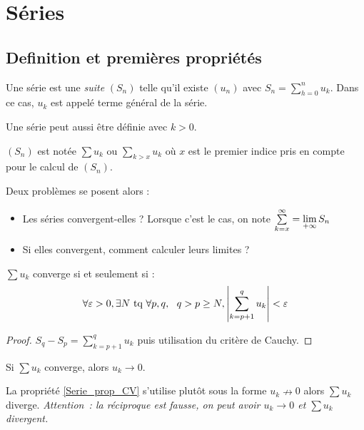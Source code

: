 \chapter{Séries}
\section{Definition et premières propriétés}

\begin{defi}
Une série est une \emph{suite} $(S_n)$ telle qu'il existe $(u_n)$ avec $S_n = \sum\limits_{h=0}^{n}u_k$. Dans ce cas, $u_k$ est appelé terme général de la série.
\end{defi}
\begin{rem}
	Une série peut aussi être définie avec $k>0$.
\end{rem}
\begin{nota}
	$(S_n)$ est notée $\sum u_k$ ou $\sum\limits_{k>x} u_k$ où $x$ est le premier indice pris en compte pour le calcul de $(S_n)$.
\end{nota}

Deux problèmes se posent alors :
\begin{itemize}
	\item Les séries convergent-elles ? Lorsque c'est le cas, on note $\sum\limits_{k=x}^{\infty} = \lim\limits_{+\infty}S_n$
	\item Si elles convergent, comment calculer leurs limites ?
\end{itemize}

\begin{prop}
$\sum u_k$ converge si et seulement si :
$$\forall\varepsilon>0,\exists N\text{~tq~}\forall p,q,~~q>p\geq N, \left|\sum\limits_{k=p+1}^q u_k\right| <\varepsilon$$
\end{prop}

\begin{proof}
$S_q-S_p = \sum\limits_{k=p+1}^q u_k$ puis utilisation du critère de Cauchy.
\end{proof}

\begin{prop} \label{Serie_prop_CV}
Si $\sum u_k$ converge, alors $u_k\to0$.
\end{prop}

\begin{rem}
La propriété \ref{Serie_prop_CV} s'utilise plutôt sous la forme $u_k\nrightarrow0$ alors $\sum u_k$ diverge. \emph{Attention~: la réciproque est fausse, on peut avoir $u_k\to0$ et $\sum u_k$ divergent.}
\end{rem}

